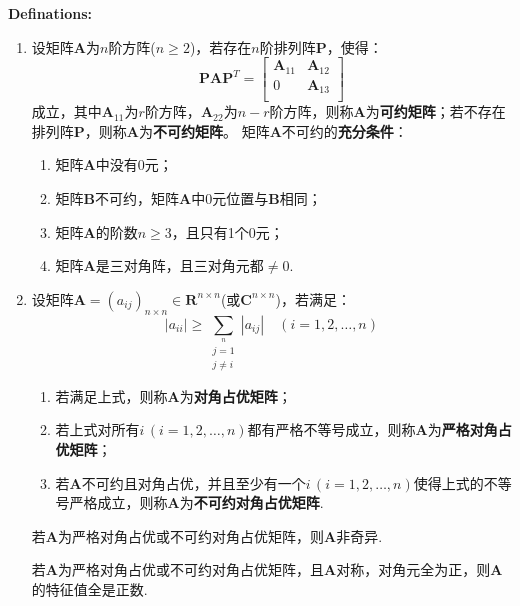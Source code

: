 \textbf{Definations:}
\begin{enumerate}
    \item 设矩阵$\boldsymbol{A}$为$n$阶方阵($n\geqslant 2$)，若存在$n$阶排列阵$\boldsymbol{P}$，使得：
        \[\boldsymbol{PAP}^T = \begin{bmatrix}
            \boldsymbol{A}_{11} & \boldsymbol{A}_{12} \\
            0 & \boldsymbol{A}_{13}\\
        \end{bmatrix} \]
        成立，其中$\boldsymbol{A}_{11}$为$r$阶方阵，$\boldsymbol{A}_{22}$为$n-r$阶方阵，则称$\boldsymbol{A}$为\textbf{可约矩阵}；若不存在排列阵$\boldsymbol{P}$，则称$\boldsymbol{A}$为\textbf{不可约矩阵}。
        矩阵$\boldsymbol{A}$不可约的\textbf{充分条件}：
        \begin{enumerate}
            \item 矩阵$\boldsymbol{A}$中没有$0$元；
            \item 矩阵$\boldsymbol{B}$不可约，矩阵$\boldsymbol{A}$中$0$元位置与$\boldsymbol{B}$相同；
            \item 矩阵$\boldsymbol{A}$的阶数$n\geqslant 3$，且只有1个0元；
            \item 矩阵$\boldsymbol{A}$是三对角阵，且三对角元都$\neq 0$.
        \end{enumerate}
        
    \item 设矩阵$\boldsymbol{A}=(a_{ij})_{n\times n}\in\mathbf{R}^{n\times n}$(或$\mathbf{C}^{n\times n}$)，若满足：
        \[ \vert a_{ii}\vert \geqslant \sum\limits_{\substack{j=1\\j\neq i}}\limits^{n}\left| a_{ij} \right|\quad (i=1,2,\dots,n) \]
        \begin{enumerate}
            \item 若满足上式，则称$\boldsymbol{A}$为\textbf{对角占优矩阵}；
            \item 若上式对所有$i\,(i=1,2,\dots,n)$都有严格不等号成立，则称$\boldsymbol{A}$为\textbf{严格对角占优矩阵}；
            \item 若$\boldsymbol{A}$不可约且对角占优，并且至少有一个$i\,(i=1,2,\dots,n)$使得上式的不等号严格成立，则称$\boldsymbol{A}$为\textbf{不可约对角占优矩阵}.
        \end{enumerate}
        \begin{th5}
            若$\boldsymbol{A}$为严格对角占优或不可约对角占优矩阵，则$\boldsymbol{A}$非奇异.
        \end{th5}
        \begin{th5}
            若$\boldsymbol{A}$为严格对角占优或不可约对角占优矩阵，且$\boldsymbol{A}$对称，对角元全为正，则$\boldsymbol{A}$的特征值全是正数.
        \end{th5}
\end{enumerate}

